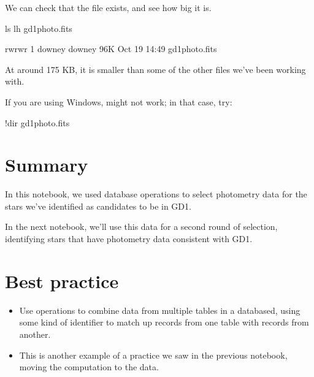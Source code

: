\documentclass[letterpaper,10pt,english]{sphinxmanual}
\begin{document}
\begin{sphinxVerbatim}[commandchars=\\\{\}]
  
 
\end{sphinxVerbatim}

We can check that the file exists, and see how big it is.

\begin{sphinxVerbatim}[commandchars=\\\{\}]
ls \PYGZhy{}lh gd1\PYGZus{}photo.fits
\end{sphinxVerbatim}

\begin{sphinxVerbatim}[commandchars=\\\{\}]
\PYGZhy{}rw\PYGZhy{}rw\PYGZhy{}r\PYGZhy{}\PYGZhy{} 1 downey downey 96K Oct 19 14:49 gd1\PYGZus{}photo.fits
\end{sphinxVerbatim}

At around 175 KB, it is smaller than some of the other files we’ve been working with.

If you are using Windows,  might not work; in that case, try:

\begin{sphinxVerbatim}[commandchars=\\\{\}]
!dir gd1\PYGZus{}photo.fits
\end{sphinxVerbatim}


\section{Summary}
\label{\detokenize{05_join:summary}}
In this notebook, we used database  operations to select photometry data for the stars we’ve identified as candidates to be in GD\sphinxhyphen{}1.

In the next notebook, we’ll use this data for a second round of selection, identifying stars that have photometry data consistent with GD\sphinxhyphen{}1.


\section{Best practice}
\label{\detokenize{05_join:best-practice}}\begin{itemize}
\item {} 
Use  operations to combine data from multiple tables in a databased, using some kind of identifier to match up records from one table with records from another.

\item {} 
This is another example of a practice we saw in the previous notebook, moving the computation to the data.

\end{itemize}
\end{document}
